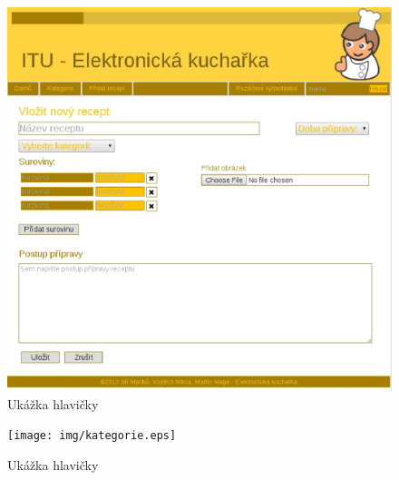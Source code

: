 \documentclass[12pt,a4paper,titlepage,final]{article}
\begin{document}
\begin{figure}

\begin{center}

\includegraphics[scale=0.7]{img/pridatrecept.eps} 
\caption{Ukážka hlavičky}


\end{center}

\end{figure}

\begin{figure}

\begin{center}

\texttt{[image: img/kategorie.eps]} 
\caption{Ukážka hlavičky}


\end{center}

\end{figure}
\end{document}
